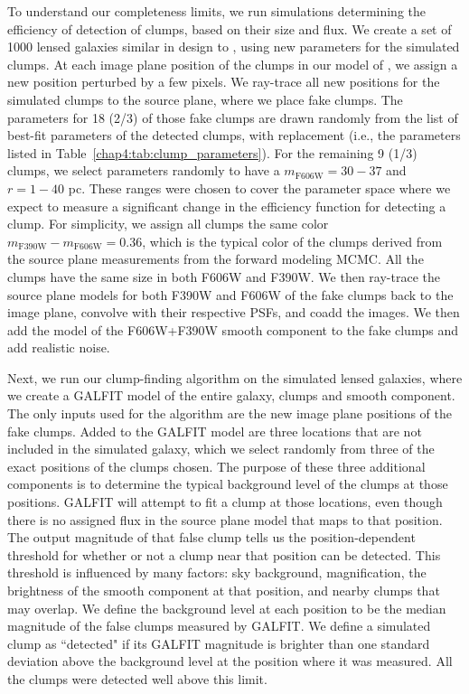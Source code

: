 To understand our completeness limits, we run simulations determining the efficiency of detection of clumps, based on their size and flux. We create a set of 1000 lensed galaxies similar in design to \giantarc, using new parameters for the simulated clumps. At each image plane position of the clumps in our model of \giantarc, we assign a new position perturbed by a few pixels. We ray-trace all new positions for the simulated clumps to the source plane, where we place fake clumps. The parameters for 18 (2/3) of those fake clumps are drawn randomly from the list of best-fit parameters of the detected clumps, with replacement (i.e., the parameters listed in Table~\ref{chap4:tab:clump_parameters}). For the remaining 9 (1/3) clumps, we select parameters randomly to have a $m_\mathrm{F606W}=30-37$ and $r=1-40$ pc. These ranges were chosen to cover the parameter space where we expect to measure a significant change in the efficiency function for detecting a clump. For simplicity, we assign all clumps the same color $m_\mathrm{F390W}-m_\mathrm{F606W}=0.36$, which is the typical color of the clumps derived from the source plane measurements from the forward modeling MCMC. All the clumps have the same size in both F606W and F390W. We then ray-trace the source plane models for both F390W and F606W of the fake clumps back to the image plane, convolve with their respective PSFs, and coadd the images. We then add the model of the F606W+F390W smooth component to the fake clumps and add realistic noise.

Next, we run our clump-finding algorithm on the simulated lensed galaxies, where we create a GALFIT model of the entire galaxy, clumps and smooth component. The only inputs used for the algorithm are the new image plane positions of the fake clumps. Added to the GALFIT model are three locations that are not included in the simulated galaxy, which we select randomly from three of the exact positions of the clumps chosen. The purpose of these three additional components is to determine the typical background level of the clumps at those positions. GALFIT will attempt to fit a clump at those locations, even though there is no assigned flux in the source plane model that maps to that position. The output magnitude of that false clump tells us the position-dependent threshold for whether or not a clump near that position can be detected. This threshold is influenced by many factors: sky background, magnification, the brightness of the smooth component at that position, and nearby clumps that may overlap. We define the background level at each position to be the median magnitude of the false clumps measured by GALFIT. We define a simulated clump as ``detected" if its GALFIT magnitude is brighter than one standard deviation above the background level at the position where it was measured. All the clumps were detected well above this limit.

